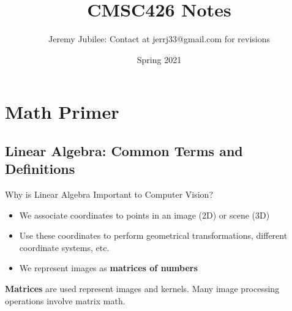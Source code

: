 \documentclass{article}
\title{CMSC426 Notes}
\author{Jeremy Jubilee: Contact at jerrj33@gmail.com for revisions}
\date{Spring 2021}
\begin{document}
\maketitle

\tableofcontents
\newpage

\section{Math Primer}

\subsection{Linear Algebra: Common Terms and Definitions}
Why is Linear Algebra Important to Computer Vision?
\begin{itemize}
    \item We associate coordinates to points in an image (2D) or scene (3D)
    \item Use these coordinates to perform geometrical transformations, different coordinate systems, etc.
    \item We represent images as \textbf{matrices of numbers}
\end{itemize}
\textbf{Matrices} are used represent images and kernels. Many image processing operations involve matrix math.  
\end{document}
